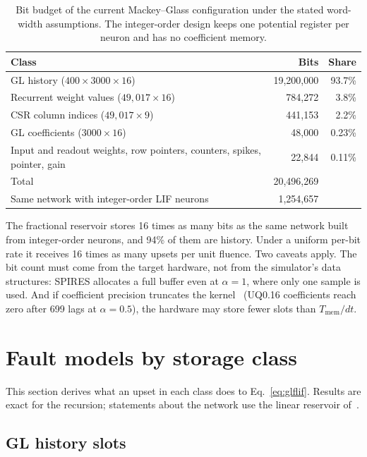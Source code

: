 \documentclass[11pt,a4paper]{article}
\begin{document}
\begin{table}[h]
\centering
\small
\begin{tabular}{@{}lrr@{}}
\toprule
Class & Bits & Share \\
\midrule
GL history ($400 \times 3000 \times 16$) & 19{,}200{,}000 & 93.7\% \\
Recurrent weight values ($49{,}017 \times 16$) & 784{,}272 & 3.8\% \\
CSR column indices ($49{,}017 \times 9$) & 441{,}153 & 2.2\% \\
GL coefficients ($3000 \times 16$) & 48{,}000 & 0.23\% \\
Input and readout weights, row pointers, counters, spikes, pointer, gain & 22{,}844 & 0.11\% \\
\midrule
Total & 20{,}496{,}269 & \\
Same network with integer-order LIF neurons & 1{,}254{,}657 & \\
\bottomrule
\end{tabular}
\caption{Bit budget of the current Mackey--Glass configuration under the stated word-width assumptions. The integer-order design keeps one potential register per neuron and has no coefficient memory.}
\label{tab:budget}
\end{table}

The fractional reservoir stores 16 times as many bits as the same network built from integer-order neurons, and 94\% of them are history. Under a uniform per-bit rate it receives 16 times as many upsets per unit fluence. Two caveats apply. The bit count must come from the target hardware, not from the simulator's data structures: SPIRES allocates a full buffer even at $\alpha = 1$, where only one sample is used. And if coefficient precision truncates the kernel~\cite{mastin2026} (UQ0.16 coefficients reach zero after 699 lags at $\alpha = 0.5$), the hardware may store fewer slots than $T_{\mathrm{mem}}/dt$.

\section{Fault models by storage class}
\label{sec:classes}

This section derives what an upset in each class does to Eq.~\eqref{eq:glflif}. Results are exact for the recursion; statements about the network use the linear reservoir of~\cite{dropout2026}.

\subsection{GL history slots}
\label{sec:history}
\end{document}
